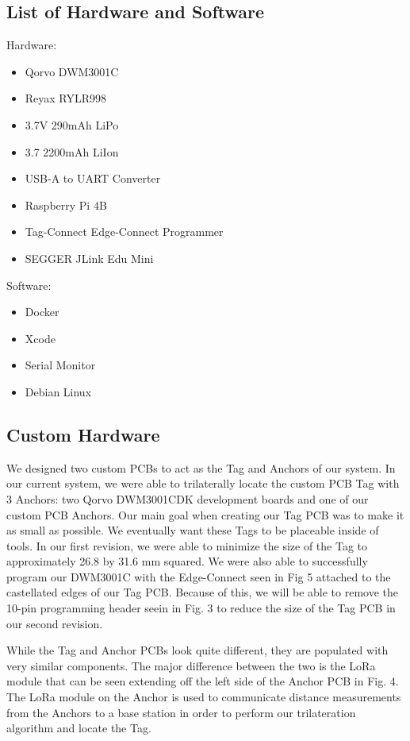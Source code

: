 \documentclass[conference]{IEEEtran}
\begin{document}
\subsection{List of Hardware and Software}
Hardware:
\begin{itemize}
    \item Qorvo DWM3001C
    \item Reyax RYLR998
    \item 3.7V 290mAh LiPo
    \item 3.7 2200mAh LiIon
    \item USB-A to UART Converter
    \item Raspberry Pi 4B
    \item Tag-Connect Edge-Connect Programmer
    \item SEGGER JLink Edu Mini
\end{itemize}

Software:
\begin{itemize}
    \item Docker
    \item Xcode
    \item Serial Monitor
    \item Debian Linux
\end{itemize}

\subsection{Custom Hardware}
We designed two custom PCBs to act as the Tag and Anchors of our system. 
In our current system, we were able to trilaterally locate the custom PCB 
Tag with 3 Anchors: two Qorvo DWM3001CDK development boards and one of our 
custom PCB Anchors. Our main goal when creating our Tag PCB was to make it 
as small as possible. We eventually want these Tags to be placeable inside 
of tools. In our first revision, we were able to minimize the size of the Tag 
to approximately 26.8 by 31.6 mm squared. We were also able to successfully 
program our DWM3001C with the Edge-Connect seen in Fig 5 attached to the 
castellated edges of our Tag PCB. Because of this, we will be able to remove 
the 10-pin programming header seein in Fig. 3 to reduce the size of the Tag 
PCB in our second revision.

While the Tag and Anchor PCBs look quite different, they are populated with 
very similar components. The major difference between the two is the LoRa 
module that can be seen extending off the left side of the Anchor PCB in Fig. 
4. The LoRa module on the Anchor is used to communicate distance  measurements 
from the Anchors to a base station in order to perform our trilateration 
algorithm and locate the Tag.
\end{document}
